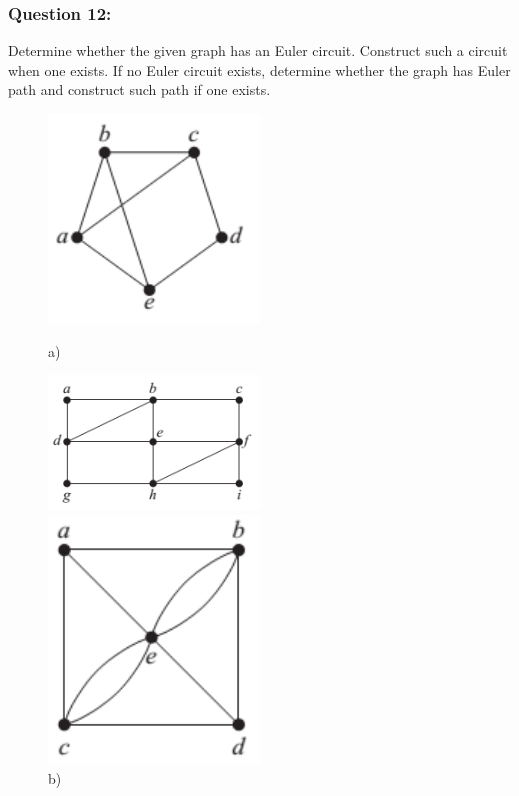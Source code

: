 \documentclass[a4paper]{article}
\begin{document}
	\subsubsection*{Question 12:}
	Determine whether the given graph has an Euler circuit. Construct such a circuit when one exists. If no Euler circuit exists, determine whether the graph has Euler path and construct such path if one exists.
	\begin{figure}[H]
		\begin{minipage}{0.5\textwidth}
			\centering
			\includegraphics[width=0.5\textwidth]{tut912_1.png}
			\caption*{a)}
		\end{minipage}
		\begin{minipage}{0.5\textwidth}
			\centering
			\includegraphics[width=0.5\textwidth]{tut912_2.png}
			\caption*{b)}
		\end{minipage}
		\begin{minipage}{0.5\textwidth}
			\centering
			\includegraphics[width=0.5\textwidth]{tut912_3.png}

\end{minipage}
\end{figure}
\end{document}
